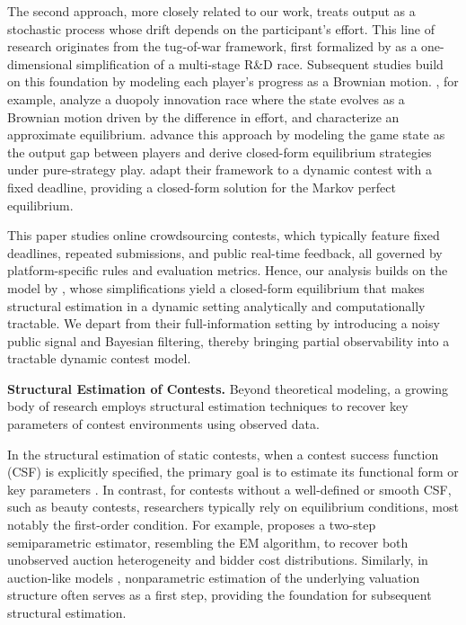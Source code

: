 \documentclass[mnsc]{informs3}
\begin{document}
The second approach, more closely related to our work, treats output as a stochastic process whose drift depends on the participant’s effort.
This line of research originates from the tug-of-war framework, first formalized by \citet{Harris1987Race} as a one-dimensional simplification of a multi-stage R\&D race.
Subsequent studies build on this foundation by modeling each player’s progress as a Brownian motion.
\citet{budd1993Duopoly}, for example, analyze a duopoly innovation race where the state evolves as a Brownian motion driven by the difference in effort, and characterize an approximate equilibrium.
\citet{Moscarini2007Contest} advance this approach by modeling the game state as the output gap between players and derive closed-form equilibrium strategies under pure-strategy play.
\citet{Ryvkin2022Fight} adapt their framework to a dynamic contest with a fixed deadline, providing a closed-form solution for the Markov perfect equilibrium.


This paper studies online crowdsourcing contests, which typically feature fixed deadlines, repeated submissions, and public real-time feedback, all governed by platform-specific rules and evaluation metrics.
Hence, our analysis builds on the model by \citet{Ryvkin2022Fight}, whose simplifications yield a closed-form equilibrium that makes structural estimation in a dynamic setting analytically and computationally tractable.
We depart from their full-information setting by introducing a noisy public signal and Bayesian filtering, thereby bringing partial observability into a tractable dynamic contest model.



\textbf{Structural Estimation of Contests.}
Beyond theoretical modeling, a growing body of research employs structural estimation techniques to recover key parameters of contest environments using observed data.

In the structural estimation of static contests, when a contest success function (CSF) is explicitly specified, the primary goal is to estimate its functional form or key parameters \citep{hwang2012technology, kang2016policy, huang2021structural}.
In contrast, for contests without a well-defined or smooth CSF, such as beauty contests, researchers typically rely on equilibrium conditions, most notably the first-order condition.
For example, \citet{yoganarasimhan2016estimation} proposes a two-step semiparametric estimator, resembling the EM algorithm, to recover both unobserved auction heterogeneity and bidder cost distributions.
Similarly, in auction-like models \citep{guerre2000optimal, shakhgildyan2022nonparametric}, nonparametric estimation of the underlying valuation structure often serves as a first step, providing the foundation for subsequent structural estimation.
\end{document}
